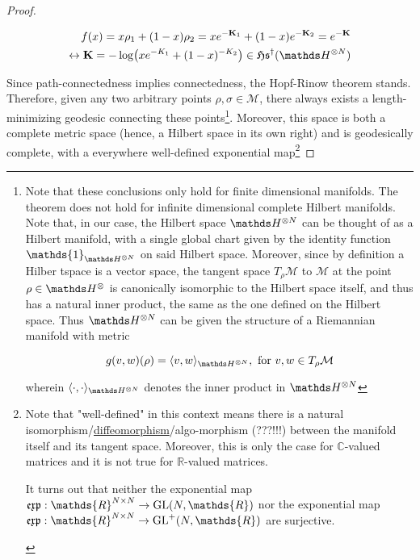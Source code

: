\documentclass{homework}
\begin{document}
\begin{proof}
\begin{tcolorbox}[title = Proof: Path-connectedness in the finite-dimensional case.]
\begin{equation}
    \begin{split}
        f(x) = x \rho_1 + (1-x) \rho_2  = x e^{-{\bf K}_1} + (1-x) e^{-{\bf K}_2} = e^{-{\bf K}} \\
        \leftrightarrow {\bf K} = - \log (x e^{-K_1} + (1-x) ^{-K_2}) \in \mathfrak{H}\mathfrak{s}^{\dagger}(\hilbert^{\otimes N}) \\
    \end{split}
\end{equation}
\end{tcolorbox}

Since path-connectedness implies connectedness, the Hopf-Rinow theorem stands. Therefore, given any two arbitrary points $\rho, \sigma \in \mathcal{M}$, there always exists a length-minimizing geodesic connecting these points\footnote{Note that these conclusions only hold for finite dimensional manifolds. The theorem does not hold for infinite dimensional complete Hilbert manifolds. Note that, in our case, the Hilbert space $\hilbert^{\otimes N}$ can be thought of as a Hilbert manifold, with a single global chart given by the identity function $\mathds{1}_{\hilbert^{\otimes N}}$ on said Hilbert space. Moreover, since by definition a Hilber tspace is a vector space, the tangent space $T_{\rho} \mathcal{M}$ to $\mathcal{M}$ at the point $\rho \in \hilbert^{\otimes}$ is canonically isomorphic to the Hilbert space itself, and thus has a natural inner product, the same as the one defined on the Hilbert space. Thus $\hilbert^{\otimes N}$ can be given the structure of a Riemannian manifold with metric 

$$
    g(v, w) (\rho) = \langle v, w \rangle_{\hilbert^{\otimes N}}, \textnormal{ for } v, w \in T_{\rho} \mathcal{M}
$$

wherein $\langle \cdot, \cdot \rangle_{\hilbert^{\otimes N}}$ denotes the inner product in $\hilbert^{\otimes N}$
}. Moreover, this space is both a complete metric space (hence, a Hilbert space in its own right) and is geodesically complete, with a everywhere well-defined exponential map\footnote{Note that "well-defined" in this context means there is a natural isomorphism/\underline{diffeomorphism}/algo-morphism (???!!!) between the manifold itself and its tangent space. Moreover, this is only the case for $\mathds{C}$-valued matrices and it is not true for $\mathds{R}$-valued matrices. \begin{tcolorbox}[title = Proof of surjective-ness of the exponential map onto the general linear group]
It turns out that neither the exponential map $\mathfrak{e}\mathfrak{x}\mathfrak{p}: \mathds{R}^{N \times N} \rightarrow \textnormal{GL}(N, \mathds{R})$ nor the exponential map $\mathfrak{e}\mathfrak{x}\mathfrak{p}: \mathds{R}^{N \times N} \rightarrow \textnormal{GL}^+(N, \mathds{R})$ are surjective. \\


\end{tcolorbox}}
\end{proof}
\end{document}
